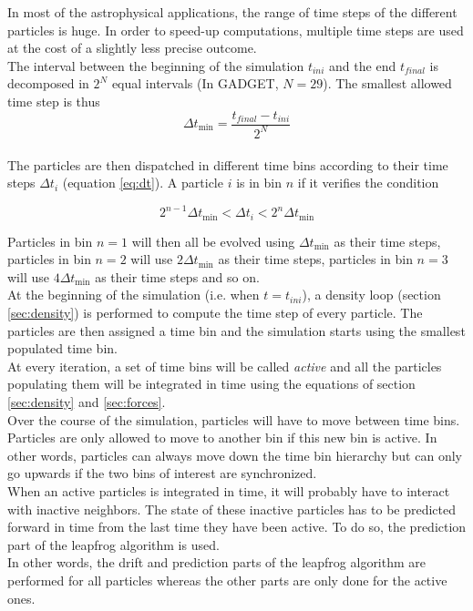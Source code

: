 \documentclass[a4paper,10pt]{report}
\begin{document}
In most of the astrophysical applications, the range of time steps of the different particles is huge. In order to
speed-up computations, multiple time steps are used at the cost of a slightly less precise outcome. \\
The interval between the beginning of the simulation $t_{ini}$ and the end $t_{final}$ is decomposed in $2^N$ equal
intervals (In GADGET, $N=29$). The smallest allowed time step is thus
\begin{equation}
 \Delta t_{\min} = \frac{t_{final} - t_{ini}}{2^N}
\end{equation}
\\
The particles are then dispatched in different time bins according to their time steps $\Delta t_i$ (equation
\ref{eq:dt}). A particle $i$ is in bin $n$ if it verifies the condition

\begin{equation}
2^{n-1} \Delta t_{\min}  < \Delta t_i < 2^n\Delta t_{\min} 
\end{equation}

Particles in bin $n=1$ will then all be evolved using $\Delta t_{\min}$ as their time steps, particles in bin $n=2$
will use $2\Delta t_{\min}$ as their time steps, particles in bin $n=3$
will use $4\Delta t_{\min}$ as their time steps and so on. \\

At the beginning of the simulation (i.e. when $t=t_{ini}$), a density loop (section
\ref{sec:density}) is performed to compute the time step of every particle. The particles are then assigned a time bin
and the simulation starts using the smallest populated time bin. \\
At every iteration, a set of time bins will be called \emph{active} and all the particles populating them will be
integrated in time using the equations of section \ref{sec:density} and \ref{sec:forces}.\\
 Over the course of the
simulation, particles will have to move between time bins. Particles are only allowed to move to another bin if this
new bin is active. In other words, particles can always move down the time bin hierarchy but can only go upwards if the
two bins of interest are synchronized.\\

When an active particles is integrated in time, it will probably have to interact with inactive neighbors. The state
of these inactive particles has to be predicted forward in time from the last time they have been active. To do
so, the prediction part of the leapfrog algorithm is used. \\
In other words, the drift and prediction parts of the leapfrog algorithm are performed for all particles whereas the
other parts are only done for the active ones.
\end{document}
